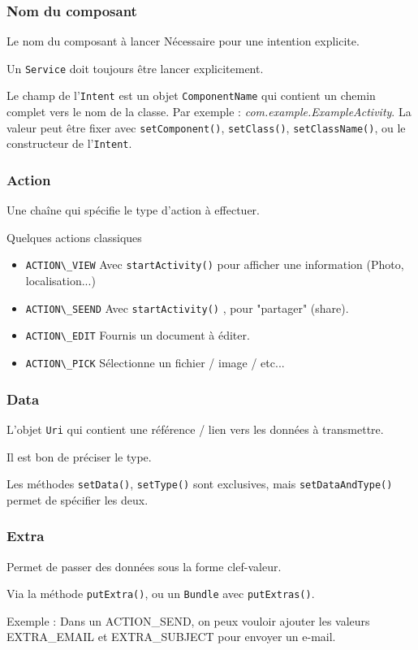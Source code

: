 \documentclass{beamer}
\begin{document}
\begin{frame}
\frametitle{Nom du composant}
\begin{block}{Le nom du composant à lancer}
Nécessaire pour une intention explicite.
\end{block}
\begin{block}{}
Un \verb!Service! doit toujours être lancer explicitement.
\end{block}
Le champ de l'\verb!Intent! est un objet \verb!ComponentName! qui contient un chemin complet vers le nom de la classe. Par exemple : \emph{com.example.ExampleActivity}. La valeur peut être fixer avec \verb!setComponent()!, \verb!setClass()!, \verb!setClassName()!, ou le constructeur de l'\verb!Intent!.

\end{frame}

\begin{frame}
\frametitle{Action}
Une chaîne qui spécifie le type d'action à effectuer.

\begin{block}{Quelques actions classiques}
\begin{itemize}
\item \verb!ACTION\_VIEW! Avec \verb!startActivity()! pour afficher une information (Photo, localisation...)
\item \verb!ACTION\_SEEND! Avec \verb!startActivity()! , pour "partager" (share).
\item \verb!ACTION\_EDIT! Fournis un document à éditer.
\item \verb!ACTION\_PICK! Sélectionne un fichier / image / etc...
\end{itemize}
\end{block}
\end{frame}

\begin{frame}
\frametitle{Data}
L'objet \verb!Uri! qui contient une référence / lien vers les données à transmettre.

\medskip

Il est bon de préciser le type.

\medskip

Les méthodes \verb!setData()!, \verb!setType()! sont exclusives, mais \verb!setDataAndType()! permet de spécifier les deux.
\end{frame}

\begin{frame}
\frametitle{Extra}
Permet de passer des données sous la forme clef-valeur.

\medskip

Via la méthode \verb!putExtra()!, ou un \verb!Bundle! avec \verb!putExtras()!.

\begin{block}{Exemple :}
Dans un ACTION\_SEND, on peux vouloir ajouter les valeurs EXTRA\_EMAIL et EXTRA\_SUBJECT pour envoyer un e-mail.
\end{block}

\end{frame}
\end{document}
